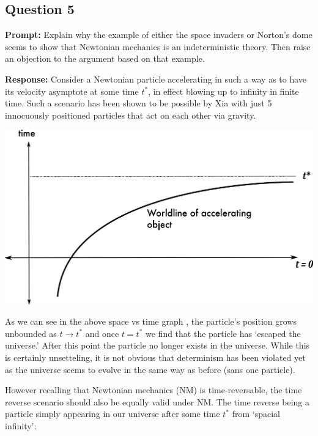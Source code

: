 \documentclass{article}
\begin{document}

\subsection*{Question 5}
\noindent\textbf{Prompt:}  Explain why the example of either the space invaders or Norton’s dome seems to show that Newtonian mechanics is an indeterministic theory. Then raise an objection to the argument based on that example.
\bigskip

\noindent\textbf{Response:} Consider a Newtonian particle accelerating in such a way as to have its velocity asymptote at some time $t^*$, in effect blowing up to infinity in finite time. Such a scenario has been shown to be possible by Xia \cite{infiniteaccel} with just 5 innocuously positioned particles that act on each other via gravity.

\begin{center}
  \includegraphics[scale=0.2]{disappearer.jpg}  
\end{center}

As we can see in the above space vs time graph \cite{spacegraph}, the particle's position grows unbounded as $t\to t^*$ and once $t=t^*$ we find that the particle has `escaped the universe.' After this point the particle no longer exists in the universe. While this is certainly unsetteling, it is not obvious that determinism has been violated yet as the universe seems to evolve in the same way as before (sans one particle).

However recalling that Newtonian mechanics (NM) is time-reversable, the time reverse scenario should also be equally valid under NM. The time reverse being a particle simply appearing in our universe after some time $t^*$ from `spacial infinity':
\end{document}
